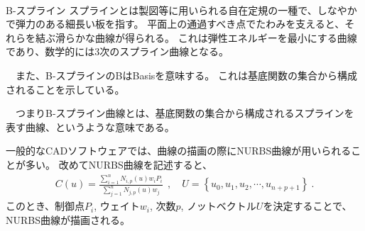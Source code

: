 ~\vfill
\begin{\Columnname}{B-スプライン}
スプラインとは製図等に用いられる自在定規の一種で、しなやかで弾力のある細長い板を指す。
平面上の通過すべき点でたわみを支えると、それらを結ぶ滑らかな曲線が得られる。
これは弾性エネルギーを最小にする曲線であり、数学的には3次のスプライン曲線となる。

　また、B-スプラインのBはBasisを意味する。
これは基底関数の集合から構成されることを示している。

　つまりB-スプライン曲線とは、基底関数の集合から構成されるスプラインを表す曲線、というような意味である。
\end{\Columnname}



\clearpage
一般的なCADソフトウェアでは、曲線の描画の際にNURBS曲線が用いられることが多い。
改めてNURBS曲線を記述すると、
\begin{align*}
  C(u) = \frac{\displaystyle\sum_{i=1}^nN_{i, p}(u)w_iP_i}{\displaystyle\sum_{j=1}^nN_{j, p}(u)w_j}~~,\quad
  U = \left\{u_0, u_1, u_2, \cdots, u_{n+p+1}\right\}\ .
\end{align*}
このとき、制御点$P_i$, ウェイト$w_i$, 次数$p$, ノットベクトル$U$を決定することで、NURBS曲線が描画される。


